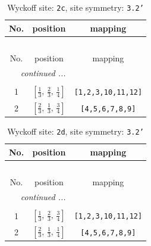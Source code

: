 \documentclass[fleqn,8pt]{jsarticle}
\begin{document}
\renewcommand{\arraystretch}{1.2}
\begin{longtable}{ccc}
\caption{Wyckoff site: {\tt 2c}, site symmetry: {\tt 3.2'}}
 \\
 \hline \hline
No. & position & mapping \\ \hline \endfirsthead

\multicolumn{2}{l}{\tablename\ \thetable{}} \\
 \hline \hline
No. & position & mapping \\ \hline \endhead

 \hline \hline
\multicolumn{2}{r}{\footnotesize\it continued ...} \\ \endfoot

 \hline \hline
\multicolumn{2}{r}{} \\ \endlastfoot

1 & $\left[ \frac{1}{3},\, \frac{2}{3},\, \frac{1}{4} \right]$ & {\tt [1,2,3,10,11,12]} \\ \hline
2 & $\left[ \frac{2}{3},\, \frac{1}{3},\, \frac{3}{4} \right]$ & {\tt [4,5,6,7,8,9]} \\
\end{longtable}
\renewcommand{\arraystretch}{1.2}
\begin{longtable}{ccc}
\caption{Wyckoff site: {\tt 2d}, site symmetry: {\tt 3.2'}}
 \\
 \hline \hline
No. & position & mapping \\ \hline \endfirsthead

\multicolumn{2}{l}{\tablename\ \thetable{}} \\
 \hline \hline
No. & position & mapping \\ \hline \endhead

 \hline \hline
\multicolumn{2}{r}{\footnotesize\it continued ...} \\ \endfoot

 \hline \hline
\multicolumn{2}{r}{} \\ \endlastfoot

1 & $\left[ \frac{1}{3},\, \frac{2}{3},\, \frac{3}{4} \right]$ & {\tt [1,2,3,10,11,12]} \\ \hline
2 & $\left[ \frac{2}{3},\, \frac{1}{3},\, \frac{1}{4} \right]$ & {\tt [4,5,6,7,8,9]} \\
\end{longtable}
\renewcommand{\arraystretch}{1.2}
\end{document}
